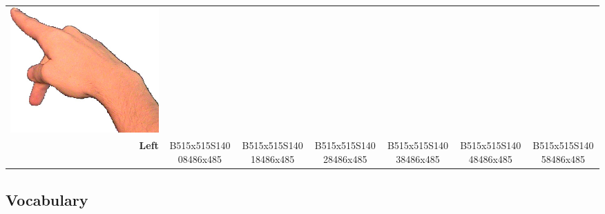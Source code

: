 \documentclass{article}
\begin{document}
\begin{center}
\begin{tabular}{r*{6}{c}}
\includegraphics[scale=0.1]{images/03-12-6.jpg}\\
\textbf{Left}&
B515x515S14008486x485&
B515x515S14018486x485&
B515x515S14028486x485&
B515x515S14038486x485&
B515x515S14048486x485&
B515x515S14058486x485\\
\end{tabular}
\end{center}

\subsection{Vocabulary}
\end{document}
